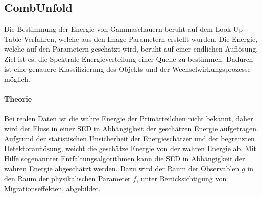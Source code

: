 \subsection{CombUnfold}%
\label{sub:combunfold}
Die Bestimmung der Energie von Gammaschauern beruht auf dem Look-Up-Table
Verfahren,
welche aus den Image Parametern erstellt wurden.
Die Energie, welche auf den Parametern geschätzt wird, beruht auf einer
endlichen Auflösung.
Ziel ist es, die Spektrale Energieverteilung einer Quelle zu bestimmen.
Dadurch ist eine genauere Klassifizierung des Objekts und der
Wechselwirkungsprozesse möglich.

\paragraph{Theorie}%


Bei realen Daten ist die wahre Energie der Primärteilchen nicht bekannt,
daher wird der Fluss in einer SED in Abhängigkeit der geschätzen Energie aufgetragen. 
Aufgrund der statistischen Unsicherheit der Energieschätzer 
und der begrenzten Detektorauflösung, 
weicht die geschätze Energie von der wahren Energie ab. 
Mit Hilfe sogenannter Entfaltungsalgorithmen kann die SED in Abhängigkeit der wahren Energie abgeschätzt werden.
Dazu wird der Raum der Observablen $g$
in den Raum der physikalischen Parameter $f$,
unter Berücksichtigung von Migrationseffekten, abgebildet.


